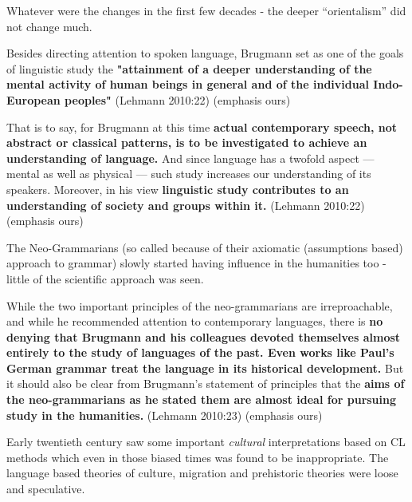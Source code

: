 \vskip 2pt

Whatever were the changes in the first few decades - the deeper “orientalism” did not change much.

\vskip 2pt

\begin{myquote}
Besides directing attention to spoken language, Brugmann set as one of the goals of linguistic study the \textbf{"attainment of a deeper understanding of the mental activity of human beings in general and of the individual Indo-European peoples"} (Lehmann 2010:22) (emphasis ours)
\end{myquote}

\vskip 2pt

\begin{myquote}
That is to say, for Brugmann at this time \textbf{actual contemporary speech, not abstract or classical patterns, is to be investigated to achieve an understanding of language.} And since language has a twofold aspect — mental as well as physical — such study increases our understanding of its speakers. Moreover, in his view \textbf{linguistic study contributes to an understanding of society and groups within it.} (Lehmann 2010:22) (emphasis ours)
\end{myquote}

The Neo-Grammarians (so called because of their axiomatic (assumptions based) approach to grammar) slowly started having influence in the humanities too - little of the scientific approach was seen.

\begin{myquote}
While the two important principles of the neo-grammarians are irreproachable, and while he recommended attention to contemporary languages, there is \textbf{no denying that Brugmann and his colleagues devoted themselves almost entirely to the study of languages of the past. Even works like Paul's German grammar treat the language in its historical development.} But it should also be clear from Brugmann's statement of principles that the \textbf{aims of the neo-grammarians as he stated them are almost ideal for pursuing study in the humanities.} (Lehmann 2010:23) (emphasis ours)
\end{myquote}

Early twentieth century saw some important \textit{cultural} interpretations based on CL methods which even in those biased times was found to be inappropriate. The language based theories of culture, migration and prehistoric theories were loose and speculative.

